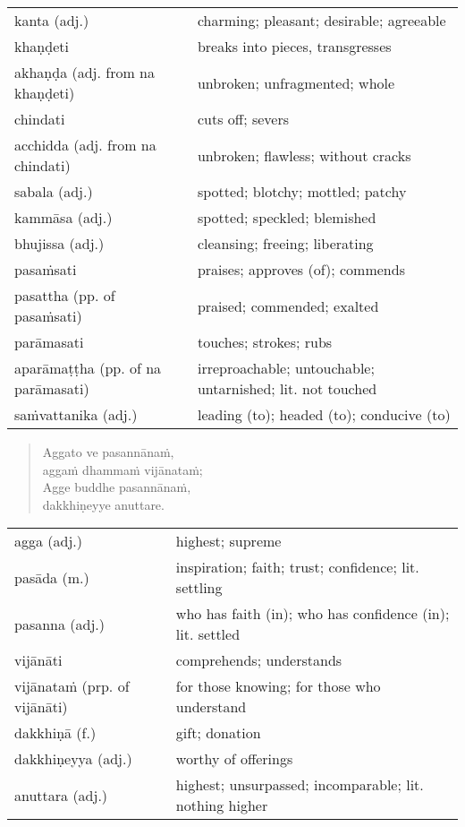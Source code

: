 \documentclass[11pt,oneside]{memoir}
\begin{document}
\begin{longtable}{L{\colOne} L{\colTwo}}
kanta (adj.) & charming; pleasant; desirable; agreeable\\[0pt]
khaṇḍeti & breaks into pieces, transgresses\\[0pt]
akhaṇḍa (adj. from na khaṇḍeti) & unbroken; unfragmented; whole\\[0pt]
chindati & cuts off; severs\\[0pt]
acchidda (adj. from na chindati) & unbroken; flawless; without cracks\\[0pt]
sabala (adj.) & spotted; blotchy; mottled; patchy\\[0pt]
kammāsa (adj.) & spotted; speckled; blemished\\[0pt]
bhujissa (adj.) & cleansing; freeing; liberating\\[0pt]
pasaṁsati & praises; approves (of); commends\\[0pt]
pasattha (pp. of pasaṁsati) & praised; commended; exalted\\[0pt]
parāmasati & touches; strokes; rubs\\[0pt]
aparāmaṭṭha (pp. of na parāmasati) & irreproachable; untouchable; untarnished; lit. not touched\\[0pt]
saṁvattanika (adj.) & leading (to); headed (to); conducive (to)\\[0pt]
\end{longtable}

\begin{quote}
Aggato ve pasannānaṁ, \\[0pt]
aggaṁ dhammaṁ vijānataṁ; \\[0pt]
Agge buddhe pasannānaṁ, \\[0pt]
dakkhiṇeyye anuttare.
\end{quote}

\begin{longtable}{L{\colOne} L{\colTwo}}
agga (adj.) & highest; supreme\\[0pt]
pasāda (m.) & inspiration; faith; trust; confidence; lit. settling\\[0pt]
pasanna (adj.) & who has faith (in); who has confidence (in); lit. settled\\[0pt]
vijānāti & comprehends; understands\\[0pt]
vijānataṁ (prp. of vijānāti) & for those knowing; for those who understand\\[0pt]
dakkhiṇā (f.) & gift; donation\\[0pt]
dakkhiṇeyya (adj.) & worthy of offerings\\[0pt]
anuttara (adj.) & highest; unsurpassed; incomparable; lit. nothing higher\\[0pt]
\end{longtable}
\end{document}
